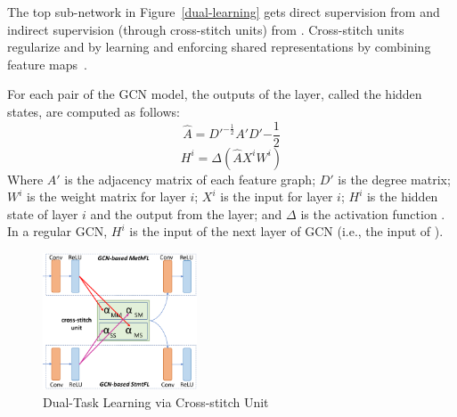 The top sub-network in Figure~\ref{dual-learning} gets direct
supervision from  and indirect supervision (through
cross-stitch units) from . Cross-stitch units regularize
 and  by learning and enforcing shared
representations by combining feature maps~\cite{misra2016cross}.


\vspace{2pt}
For each pair of the GCN model, the outputs of the
 layer, called the hidden states, are computed as follows:
\begin{equation}\label{eq:1}
	\hat{A} = D'^{-\frac{1}{2}}A'D'{-\frac{1}{2}}
\end{equation}
\begin{equation}\label{eq:2}
	H^{i} = \Delta(\hat{A}X^{i}W^{i})
\end{equation}
Where $A'$ is the adjacency matrix of each feature graph; $D'$ is the
degree matrix; $W^{i}$ is the weight matrix for layer $i$; $X^{i}$ is
the input for layer $i$; $H^{i}$ is the hidden state of layer $i$ and
the output from the  layer; and $\Delta$ is the activation
function .
In a regular GCN, $H^{i}$ is the input of the next layer of GCN (i.e.,
the input of ).



\begin{figure}[t]
	\centering
	\includegraphics[width=1.8in]{graphs/cross-stitch-2.png}
        \vspace{-6pt}
	\caption{Dual-Task Learning via Cross-stitch Unit}
	\label{cross-stitch}
\end{figure}

